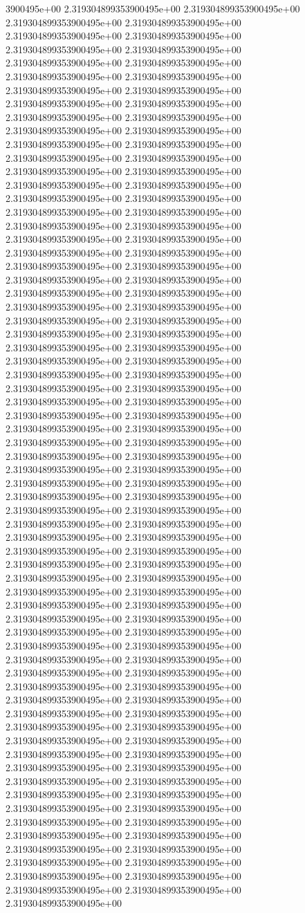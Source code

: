 3900495e+00	2.319304899353900495e+00	2.319304899353900495e+00	2.319304899353900495e+00	2.319304899353900495e+00	2.319304899353900495e+00	2.319304899353900495e+00	2.319304899353900495e+00	2.319304899353900495e+00	2.319304899353900495e+00	2.319304899353900495e+00	2.319304899353900495e+00	2.319304899353900495e+00	2.319304899353900495e+00	2.319304899353900495e+00	2.319304899353900495e+00	2.319304899353900495e+00	2.319304899353900495e+00	2.319304899353900495e+00	2.319304899353900495e+00	2.319304899353900495e+00	2.319304899353900495e+00	2.319304899353900495e+00	2.319304899353900495e+00	2.319304899353900495e+00	2.319304899353900495e+00	2.319304899353900495e+00	2.319304899353900495e+00	2.319304899353900495e+00	2.319304899353900495e+00	2.319304899353900495e+00	2.319304899353900495e+00	2.319304899353900495e+00	2.319304899353900495e+00	2.319304899353900495e+00	2.319304899353900495e+00	2.319304899353900495e+00	2.319304899353900495e+00	2.319304899353900495e+00	2.319304899353900495e+00	2.319304899353900495e+00	2.319304899353900495e+00	2.319304899353900495e+00	2.319304899353900495e+00	2.319304899353900495e+00	2.319304899353900495e+00	2.319304899353900495e+00	2.319304899353900495e+00	2.319304899353900495e+00	2.319304899353900495e+00	2.319304899353900495e+00	2.319304899353900495e+00	2.319304899353900495e+00	2.319304899353900495e+00	2.319304899353900495e+00	2.319304899353900495e+00	2.319304899353900495e+00	2.319304899353900495e+00	2.319304899353900495e+00	2.319304899353900495e+00	2.319304899353900495e+00	2.319304899353900495e+00	2.319304899353900495e+00	2.319304899353900495e+00	2.319304899353900495e+00	2.319304899353900495e+00	2.319304899353900495e+00	2.319304899353900495e+00	2.319304899353900495e+00	2.319304899353900495e+00	2.319304899353900495e+00	2.319304899353900495e+00	2.319304899353900495e+00	2.319304899353900495e+00	2.319304899353900495e+00	2.319304899353900495e+00	2.319304899353900495e+00	2.319304899353900495e+00	2.319304899353900495e+00	2.319304899353900495e+00	2.319304899353900495e+00	2.319304899353900495e+00	2.319304899353900495e+00	2.319304899353900495e+00	2.319304899353900495e+00	2.319304899353900495e+00	2.319304899353900495e+00	2.319304899353900495e+00	2.319304899353900495e+00	2.319304899353900495e+00	2.319304899353900495e+00	2.319304899353900495e+00	2.319304899353900495e+00	2.319304899353900495e+00	2.319304899353900495e+00	2.319304899353900495e+00	2.319304899353900495e+00	2.319304899353900495e+00	2.319304899353900495e+00	2.319304899353900495e+00	2.319304899353900495e+00	2.319304899353900495e+00	2.319304899353900495e+00	2.319304899353900495e+00	2.319304899353900495e+00	2.319304899353900495e+00	2.319304899353900495e+00	2.319304899353900495e+00	2.319304899353900495e+00	2.319304899353900495e+00	2.319304899353900495e+00	2.319304899353900495e+00	2.319304899353900495e+00	2.319304899353900495e+00	2.319304899353900495e+00	2.319304899353900495e+00	2.319304899353900495e+00	2.319304899353900495e+00	2.319304899353900495e+00	2.319304899353900495e+00	2.319304899353900495e+00	2.319304899353900495e+00	2.319304899353900495e+00	2.319304899353900495e+00	2.319304899353900495e+00	2.319304899353900495e+00	2.319304899353900495e+00	2.319304899353900495e+00	2.319304899353900495e+00	2.319304899353900495e+00	2.319304899353900495e+00	2.319304899353900495e+00	2.319304899353900495e+00	2.319304899353900495e+00